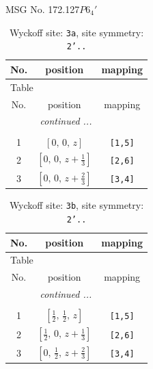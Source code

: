 \documentclass[fleqn,8pt]{jsarticle}
\begin{document}
\setcounter{MaxMatrixCols}{32}

\renewcommand{\tablename}{Table~}
\renewcommand{\figurename}{Figure~}
\begin{center}
\LARGE
MSG No. 172.127\quad$P6_{4}'$
\end{center}
\renewcommand{\arraystretch}{1.2}
\begin{longtable}{ccc}
\caption{Wyckoff site: {\tt 3a}, site symmetry: {\tt 2'..}}
 \\
 \hline \hline
No. & position & mapping \\ \hline \endfirsthead

\multicolumn{2}{l}{\tablename\ \thetable{}} \\
 \hline \hline
No. & position & mapping \\ \hline \endhead

 \hline \hline
\multicolumn{2}{r}{\footnotesize\it continued ...} \\ \endfoot

 \hline \hline
\multicolumn{2}{r}{} \\ \endlastfoot

1 & $\left[ 0,\, 0,\, z \right]$ & {\tt [1,5]} \\ \hline
2 & $\left[ 0,\, 0,\, z + \frac{1}{3} \right]$ & {\tt [2,6]} \\ \hline
3 & $\left[ 0,\, 0,\, z + \frac{2}{3} \right]$ & {\tt [3,4]} \\
\end{longtable}
\renewcommand{\arraystretch}{1.2}
\begin{longtable}{ccc}
\caption{Wyckoff site: {\tt 3b}, site symmetry: {\tt 2'..}}
 \\
 \hline \hline
No. & position & mapping \\ \hline \endfirsthead

\multicolumn{2}{l}{\tablename\ \thetable{}} \\
 \hline \hline
No. & position & mapping \\ \hline \endhead

 \hline \hline
\multicolumn{2}{r}{\footnotesize\it continued ...} \\ \endfoot

 \hline \hline
\multicolumn{2}{r}{} \\ \endlastfoot

1 & $\left[ \frac{1}{2},\, \frac{1}{2},\, z \right]$ & {\tt [1,5]} \\ \hline
2 & $\left[ \frac{1}{2},\, 0,\, z + \frac{1}{3} \right]$ & {\tt [2,6]} \\ \hline
3 & $\left[ 0,\, \frac{1}{2},\, z + \frac{2}{3} \right]$ & {\tt [3,4]} \\
\end{longtable}
\end{document}
